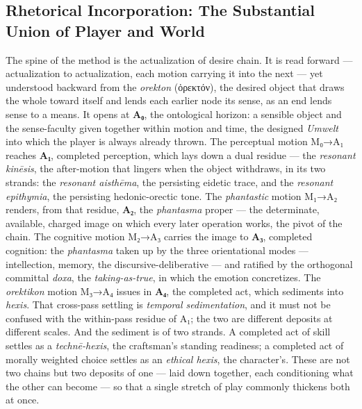 \documentclass{article}
\newcommand{\gk}[1]{{\greekfont #1}}
\begin{document}
\subsection*{Rhetorical Incorporation: The Substantial Union of Player and World}

The spine of the method is the actualization of desire chain. It is read forward — actualization to actualization, each motion carrying it into the next — yet understood backward from the \textit{orekton} (\gk{ὀρεκτόν}), the desired object that draws the whole toward itself and lends each earlier node its sense, as an end lends sense to a means. It opens at \textbf{A₀}, the ontological horizon: a sensible object and the sense-faculty given together within motion and time, the designed \textit{Umwelt} into which the player is always already thrown. The perceptual motion M₀→A₁ reaches \textbf{A₁}, completed perception, which lays down a dual residue — the \textit{resonant kinēsis}, the after-motion that lingers when the object withdraws, in its two strands: the \textit{resonant aisthēma}, the persisting eidetic trace, and the \textit{resonant epithymia}, the persisting hedonic-orectic tone. The \textit{phantastic} motion M₁→A₂ renders, from that residue, \textbf{A₂}, the \textit{phantasma} proper — the determinate, available, charged image on which every later operation works, the pivot of the chain. The cognitive motion M₂→A₃ carries the image to \textbf{A₃}, completed cognition: the \textit{phantasma} taken up by the three orientational modes — intellection, memory, the discursive-deliberative — and ratified by the orthogonal committal \textit{doxa}, the \textit{taking-as-true}, in which the emotion concretizes. The \textit{orektikon} motion M₃→A₄ issues in \textbf{A₄}, the completed act, which sediments into \textit{hexis}. That cross-pass settling is \textit{temporal sedimentation}, and it must not be confused with the within-pass residue of A₁; the two are different deposits at different scales. And the sediment is of two strands. A completed act of skill settles as a \textit{technē-hexis}, the craftsman's standing readiness; a completed act of morally weighted choice settles as an \textit{ethical hexis}, the character's. These are not two chains but two deposits of one — laid down together, each conditioning what the other can become — so that a single stretch of play commonly thickens both at once.
\end{document}
